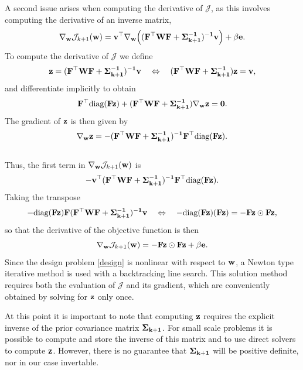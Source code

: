 \documentclass[12pt]{article}
\newcommand {\bfv}   { {\bf v} }
\newcommand {\bfe}   { {\bf e} }
\newcommand {\bfw}   { {\bf w} }
\newcommand {\bfz}   { {\bf z} }
\newcommand {\bfF}  { {\bf F} }
\newcommand{\JJ}  {\mathcal{J}}    %
\newcommand{\W}{\text{\bf W}}
\newcommand{\Sigh}{\bf \Sigma}
\begin{document}
A second issue arises when computing the derivative  of $\JJ$, as this involves computing the derivative of an inverse matrix, 
\begin{equation*}
\nabla_{\bfw} \JJ_{k+1}(\bfw) =\bfv^{\top} \nabla_{\bfw}\Big((\bfF^{\top} \W \bfF + \Sigh_{k+1}^{-1})^{-1}\bfv \Big) + \beta \bfe.
\end{equation*}
To compute  the derivative of $\JJ$ we define  
\begin{eqnarray}
\label{eq:z}
\bfz = (\bfF^{\top} \W \bfF + \Sigh_{k+1}^{-1})^{-1}\bfv \quad \Leftrightarrow \quad
(\bfF^{\top} \W \bfF + \Sigh_{k+1}^{-1})\bfz = \bfv,
\end{eqnarray}
and differentiate implicitly to obtain 
\begin{eqnarray*}
\bfF^{\top}\text{diag}(\bfF \bfz) + (\bfF^{\top} \W \bfF + \Sigh_{k+1}^{-1})\nabla_{\bfw}\bfz = 0.
\end{eqnarray*}
The gradient of $\bfz$ is then given by
\begin{equation*}
\nabla_{\bfw}\bfz = -(\bfF^{\top} \W \bfF + \Sigh_{k+1}^{-1})^{-1} \bfF^{\top}\text{diag}(\bfF \bfz).
\end{equation*}
\\
Thus, the first term in $\nabla_{\bfw} \JJ_{k+1}(\bfw)$ is
\begin{equation*}
-\bfv^{\top}(\bfF^{\top} \W \bfF + \Sigh_{k+1}^{-1})^{-1} \bfF^{\top}\text{diag}(\bfF \bfz). 
\end{equation*}
Taking the transpose 
\begin{equation*}
-\text{diag}(\bfF \bfz)\bfF(\bfF^{\top} \W \bfF + \Sigh_{k+1}^{-1})^{-1} \bfv
\quad \Leftrightarrow\quad -\text{diag}(\bfF \bfz)(\bfF \bfz) = -\bfF \bfz \odot \bfF \bfz,
\end{equation*}
so that the derivative of the objective function is then 
\begin{equation}
\nabla_{\bfw} \JJ_{k+1}(\bfw) =  -\bfF \bfz \odot \bfF \bfz + \beta \bfe.
\end{equation}
Since the design problem \eqref{design} is nonlinear with respect to $\bfw$, a Newton type iterative method is used with a backtracking line search. This solution method requires both the evaluation of $\JJ$ and  its gradient, which are conveniently obtained by solving for $\bfz$ only once. 

At this point it is important to note that computing $\bfz$ requires the explicit inverse of the prior covariance matrix $\Sigh_{k+1}$. For small scale problems it is possible to compute and store the inverse of this matrix and to use direct solvers to compute $\bfz$. However, there is no guarantee that $\Sigh_{k+1}$ will be positive definite, nor in our case  invertable. 
\end{document}
